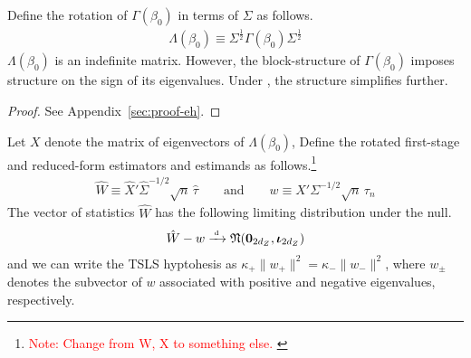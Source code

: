 Define the rotation of  \(\Gamma(\beta_0)\) in terms of \(\Sigma\)  as follows.
\begin{align}
\Lambda(\beta_0) \equiv 
\Sigma^{\frac{1}{2}} 
\Gamma(\beta_0)
\Sigma^{\frac{1}{2}}
\end{align}
\(\Lambda(\beta_0)\) is an indefinite matrix. However, the block-structure of \(\Gamma(\beta_0)\) imposes structure on the sign of its eigenvalues. Under , the structure simplifies further.

\begin{proof}
    See Appendix~\ref{sec:proof-eh}.
\end{proof}
\noindent 
Let \(X\) denote the matrix of eigenvectors of \(\Lambda(\beta_0)\),
 Define the rotated first-stage and reduced-form estimators and estimands as follows.\footnote{\textcolor{red}{Note: Change from W, X to something else. }}
\begin{align}
    \hat W \equiv \hat X'\hat\Sigma^{-1/2}\sqrt{n}\,\hat\tau
    \qquad\text{and}\qquad
    w \equiv X'\Sigma^{-1/2}\sqrt{n}\,\tau_n    
\end{align}
The vector of statistics \(\hat W\) has the following limiting distribution under the null.
\begin{align}
\hat W - w\xrightarrow{{\scriptscriptstyle \mathrm{\;d\;}}} \mathfrak{N}(\mathbf{0}_{2d_Z},\boldsymbol{\iota}_{2d_Z})
\end{align}
and we can write the TSLS hyptohesis as \(\kappa_+\lVert w_+ \rVert^2 = \kappa_-\lVert w_- \rVert^2\), where \(w_\pm\) denotes the subvector of \(w\) associated with positive and negative eigenvalues, respectively.

